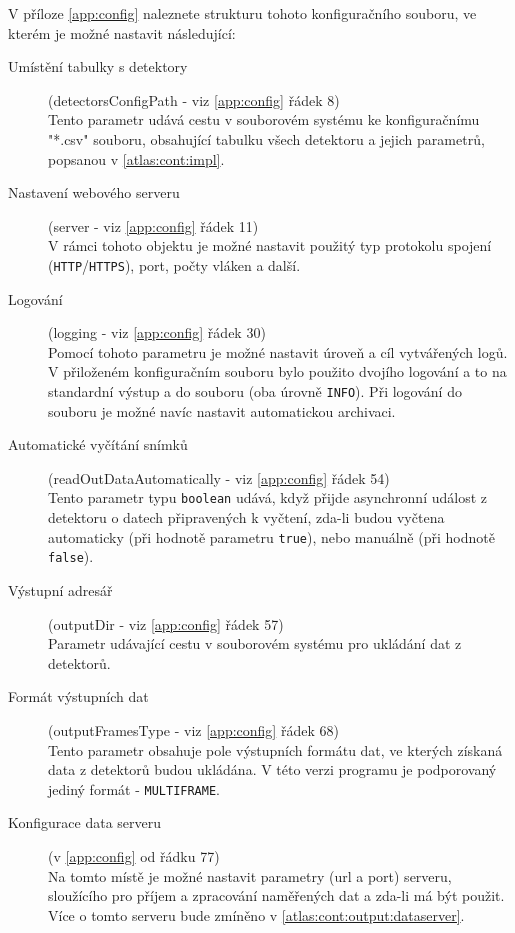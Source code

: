 V příloze \ref{app:config} naleznete strukturu tohoto konfiguračního souboru, ve kterém je možné nastavit následující:
\begin{description}
	\item[Umístění tabulky s detektory] (detectorsConfigPath - viz \ref{app:config} řádek 8)\\
		Tento parametr udává cestu v souborovém systému ke konfiguračnímu "*.csv" souboru, obsahující tabulku všech detektoru a jejich parametrů, popsanou v \ref{atlas:cont:impl}.
	\item[Nastavení webového serveru] (server - viz \ref{app:config} řádek 11)\\
		V rámci tohoto objektu je možné nastavit použitý typ protokolu spojení (\texttt{HTTP}/\texttt{HTTPS}), port, počty vláken a další.
	\item[Logování] (logging - viz \ref{app:config} řádek 30)\\
		Pomocí tohoto parametru je možné nastavit úroveň a cíl vytvářených logů. V přiloženém konfiguračním souboru bylo použito dvojího logování a to na standardní výstup a do souboru (oba úrovně \texttt{INFO}). Při logování do souboru je možné navíc nastavit automatickou archivaci.
	\item[Automatické vyčítání snímků] (readOutDataAutomatically - viz \ref{app:config} řádek 54)\\
		Tento parametr typu \texttt{boolean} udává, když přijde asynchronní událost z detektoru o datech připravených k vyčtení, zda-li budou vyčtena automaticky (při hodnotě parametru \texttt{true}), nebo manuálně (při hodnotě \texttt{false}).
	\item[Výstupní adresář] (outputDir - viz \ref{app:config} řádek 57)\\
		Parametr udávající cestu v souborovém systému pro ukládání dat z detektorů.
	\item[Formát výstupních dat] (outputFramesType - viz \ref{app:config} řádek 68)\\
		Tento parametr obsahuje pole výstupních formátu dat, ve kterých získaná data z detektorů budou ukládána. V této verzi programu je podporovaný jediný formát - \texttt{MULTIFRAME}.
	\item[Konfigurace data serveru] (v \ref{app:config} od řádku 77)\\
		Na tomto místě je možné nastavit parametry (url a port) serveru, sloužícího pro příjem a zpracování naměřených dat a zda-li má být použit. Více o tomto serveru bude zmíněno v \ref{atlas:cont:output:dataserver}.
\end{description}


